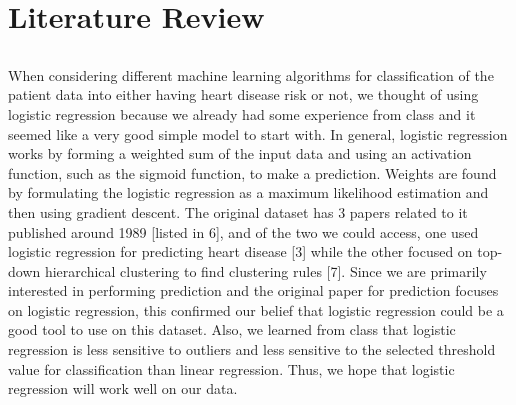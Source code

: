 \documentclass[12pt]{article}
\begin{document}
\newpage
\section*{Literature Review}

\subsection*{}
\hspace{\parindent} When considering different machine learning algorithms for classification of the patient data into either having heart disease risk or not, we thought of using logistic regression because we already had some experience from class and it seemed like a very good simple model to start with. In general, logistic regression works by forming a weighted sum of the input data and using an activation function, such as the sigmoid function, to make a prediction. Weights are found by formulating the logistic regression as a maximum likelihood estimation and then using gradient descent. The original dataset has 3 papers related to it published around 1989 [listed in 6], and of the two we could access, one used logistic regression for predicting heart disease [3] while the other focused on top-down hierarchical clustering to find clustering rules [7]. Since we are primarily interested in performing prediction and the original paper for prediction focuses on logistic regression, this confirmed our belief that logistic regression could be a good tool to use on this dataset. Also, we learned from class that logistic regression is less sensitive to outliers and less sensitive to the selected threshold value for classification than linear regression. Thus, we hope that logistic regression will work well on our data. \par 
\end{document}
